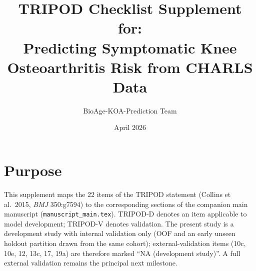 \documentclass[11pt,a4paper]{article}
\title{TRIPOD Checklist Supplement for:\\
\large Predicting Symptomatic Knee Osteoarthritis Risk from CHARLS Data}
\author{BioAge-KOA-Prediction Team}
\date{April 2026}
\begin{document}
\maketitle

\section*{Purpose}
This supplement maps the 22 items of the TRIPOD statement (Collins et al.\ 2015, \textit{BMJ} 350:g7594) to the corresponding sections of the companion main manuscript (\texttt{manuscript\_main.tex}). TRIPOD-D denotes an item applicable to model development; TRIPOD-V denotes validation. The present study is a development study with internal validation only (OOF and an early unseen holdout partition drawn from the same cohort); external-validation items (10c, 10e, 12, 13c, 17, 19a) are therefore marked ``NA (development study)''. A full external validation remains the principal next milestone.
\end{document}

